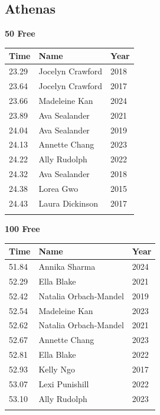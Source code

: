 
\clearpage
{}
\clearpage
\subsection{Athenas}
\vspace{1.2em}
\noindent\begin{minipage}[t]{0.48\textwidth}
\centering
\textbf{\textcolor{teamprimary}{50 Free}}\par
\vspace{0.5em}
\centering
\small
\renewcommand{\arraystretch}{1.0}
\setlength{\tabcolsep}{4pt}
\begin{tabular}{@{}p{1.8cm}p{3.0cm}p{1.0cm}@{}}
\toprule
\textbf{Time} & \textbf{Name} & \textbf{Year} \\
\midrule
23.29 & Jocelyn Crawford & 2018 \\
23.64 & Jocelyn Crawford & 2017 \\
23.66 & Madeleine Kan & 2024 \\
23.89 & Ava Sealander & 2021 \\
24.04 & Ava Sealander & 2019 \\
24.13 & Annette Chang & 2023 \\
24.22 & Ally Rudolph & 2022 \\
24.32 & Ava Sealander & 2018 \\
24.38 & Lorea Gwo & 2015 \\
24.43 & Laura Dickinson & 2017 \\
\bottomrule
\vspace{0.5em}
\end{tabular}
\end{minipage}
\hfill
\begin{minipage}[t]{0.48\textwidth}
\centering
\textbf{\textcolor{teamprimary}{100 Free}}\par
\vspace{0.5em}
\centering
\small
\renewcommand{\arraystretch}{1.0}
\setlength{\tabcolsep}{4pt}
\begin{tabular}{@{}p{1.8cm}p{3.0cm}p{1.0cm}@{}}
\toprule
\textbf{Time} & \textbf{Name} & \textbf{Year} \\
\midrule
51.84 & Annika Sharma & 2024 \\
52.29 & Ella Blake & 2021 \\
52.42 & Natalia Orbach-Mandel & 2019 \\
52.54 & Madeleine Kan & 2023 \\
52.62 & Natalia Orbach-Mandel & 2021 \\
52.67 & Annette Chang & 2023 \\
52.81 & Ella Blake & 2022 \\
52.93 & Kelly Ngo & 2017 \\
53.07 & Lexi Punishill & 2022 \\
53.10 & Ally Rudolph & 2023 \\
\bottomrule
\vspace{0.5em}
\end{tabular}
\end{minipage}
